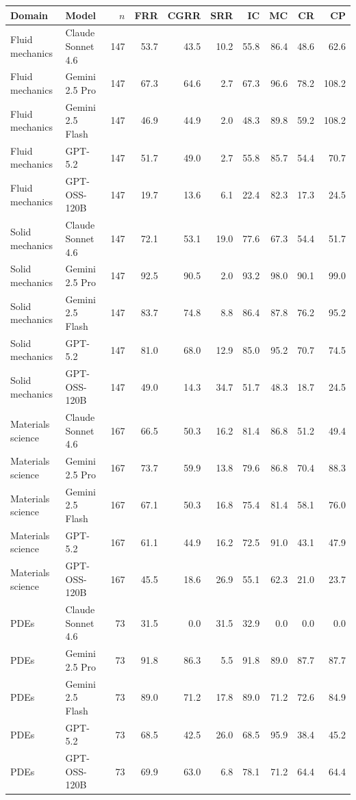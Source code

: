 \begin{tabular}{llrrrrrrrr}
\toprule
Domain & Model & $n$ & FRR & CGRR & SRR & IC & MC & CR & CP \\
\midrule
Fluid mechanics & Claude Sonnet 4.6 & 147 & 53.7 & 43.5 & 10.2 & 55.8 & 86.4 & 48.6 & 62.6 \\
Fluid mechanics & Gemini 2.5 Pro & 147 & 67.3 & 64.6 & 2.7 & 67.3 & 96.6 & 78.2 & 108.2 \\
Fluid mechanics & Gemini 2.5 Flash & 147 & 46.9 & 44.9 & 2.0 & 48.3 & 89.8 & 59.2 & 108.2 \\
Fluid mechanics & GPT-5.2 & 147 & 51.7 & 49.0 & 2.7 & 55.8 & 85.7 & 54.4 & 70.7 \\
Fluid mechanics & GPT-OSS-120B & 147 & 19.7 & 13.6 & 6.1 & 22.4 & 82.3 & 17.3 & 24.5 \\
Solid mechanics & Claude Sonnet 4.6 & 147 & 72.1 & 53.1 & 19.0 & 77.6 & 67.3 & 54.4 & 51.7 \\
Solid mechanics & Gemini 2.5 Pro & 147 & 92.5 & 90.5 & 2.0 & 93.2 & 98.0 & 90.1 & 99.0 \\
Solid mechanics & Gemini 2.5 Flash & 147 & 83.7 & 74.8 & 8.8 & 86.4 & 87.8 & 76.2 & 95.2 \\
Solid mechanics & GPT-5.2 & 147 & 81.0 & 68.0 & 12.9 & 85.0 & 95.2 & 70.7 & 74.5 \\
Solid mechanics & GPT-OSS-120B & 147 & 49.0 & 14.3 & 34.7 & 51.7 & 48.3 & 18.7 & 24.5 \\
Materials science & Claude Sonnet 4.6 & 167 & 66.5 & 50.3 & 16.2 & 81.4 & 86.8 & 51.2 & 49.4 \\
Materials science & Gemini 2.5 Pro & 167 & 73.7 & 59.9 & 13.8 & 79.6 & 86.8 & 70.4 & 88.3 \\
Materials science & Gemini 2.5 Flash & 167 & 67.1 & 50.3 & 16.8 & 75.4 & 81.4 & 58.1 & 76.0 \\
Materials science & GPT-5.2 & 167 & 61.1 & 44.9 & 16.2 & 72.5 & 91.0 & 43.1 & 47.9 \\
Materials science & GPT-OSS-120B & 167 & 45.5 & 18.6 & 26.9 & 55.1 & 62.3 & 21.0 & 23.7 \\
PDEs & Claude Sonnet 4.6 & 73 & 31.5 & 0.0 & 31.5 & 32.9 & 0.0 & 0.0 & 0.0 \\
PDEs & Gemini 2.5 Pro & 73 & 91.8 & 86.3 & 5.5 & 91.8 & 89.0 & 87.7 & 87.7 \\
PDEs & Gemini 2.5 Flash & 73 & 89.0 & 71.2 & 17.8 & 89.0 & 71.2 & 72.6 & 84.9 \\
PDEs & GPT-5.2 & 73 & 68.5 & 42.5 & 26.0 & 68.5 & 95.9 & 38.4 & 45.2 \\
PDEs & GPT-OSS-120B & 73 & 69.9 & 63.0 & 6.8 & 78.1 & 71.2 & 64.4 & 64.4 \\
\bottomrule
\end{tabular}